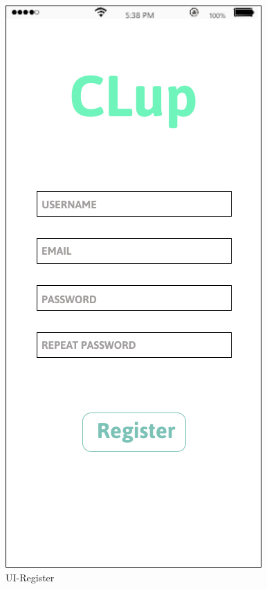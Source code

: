 \documentclass[a4paper,12pt]{report}
\begin{document}
\begin{figure}[H]
\begin{minipage}[t]{0.5\linewidth}
		\includegraphics[scale=0.5]{UI-Register.png}
		\caption{UI-Register}
		\label{UI-Register}
	\end{minipage}
\end{figure}
\end{document}
